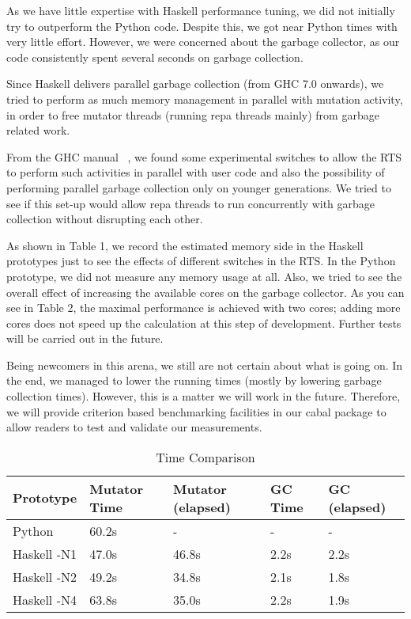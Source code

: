 \documentclass{tmr}
\begin{document}
As we have little expertise with Haskell performance tuning, we did not initially try to outperform the Python
code.  Despite this, we got near Python times with very little effort.
However, we were concerned about the garbage collector, as our code
consistently spent several seconds on garbage collection.


Since Haskell
delivers parallel garbage collection (from GHC 7.0 onwards), we tried to perform as much memory management in parallel
with mutation activity, in order to free mutator threads (running repa threads mainly) from garbage related work.

From the GHC manual ~\cite{ghc}, we found some experimental switches to allow the RTS to perform such activities in parallel
with user code and also the possibility of performing parallel garbage collection only on younger generations.
We tried to see if this set-up would allow repa threads to run concurrently with garbage collection without  
disrupting each other.

As shown in Table 1, we record the estimated memory side in the 
Haskell prototypes just to see the effects of different switches in the RTS. In the Python
prototype, we did not measure any memory usage at all. Also, we tried to see the overall effect of 
increasing the available cores on the garbage collector. As you can see in Table
2, the maximal performance is achieved with two cores; adding more cores does not speed up
the calculation at this step of development. Further tests will be carried out in the future.

Being newcomers in this arena, we still are not certain about what is going on.
In the end, we managed to lower the running times (mostly by lowering garbage collection times).
However, this is a matter we will work in the future. Therefore, we will
provide criterion based benchmarking facilities in our cabal package to allow 
readers to test and validate our measurements.

\begin{table}[float,captionpos=b,belowcaptionskip=4pt]
\begin{center}
    \begin{tabular}{ l l l l l }
Prototype  & Mutator Time & Mutator (elapsed) & GC Time & GC (elapsed) \\ 
\hline Python   & 60.2s   & -      & -    & - \\
Haskell -N1 & 47.0s   & 46.8s  & 2.2s & 2.2s \\
Haskell -N2  & 49.2s   & 34.8s  & 2.1s & 1.8s \\
Haskell -N4  & 63.8s   & 35.0s  & 2.2s & 1.9s  \\

    \end{tabular} 
\end{center}
\label{tab:second}
\caption{Time Comparison}
\end{table}
\end{document}
